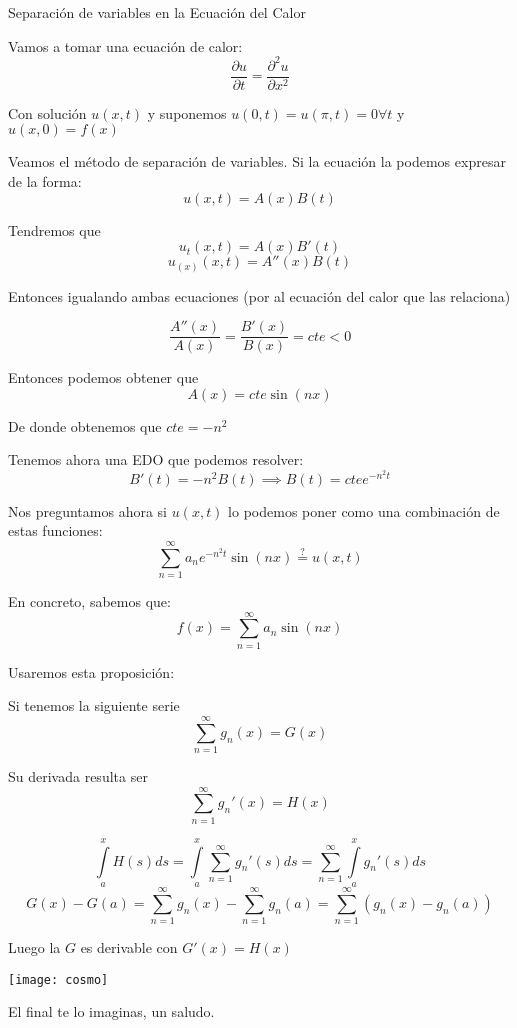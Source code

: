\documentclass[openany]{book}
\begin{document}
\begin{method}
  Separación de variables en la Ecuación del Calor
  
  Vamos a tomar una ecuación de calor:
  $$ \dfrac{\partial u}{\partial t} = \dfrac{\partial ^2 u}{\partial x^2} $$
  
  Con solución $ u(x,t) $ y suponemos $ u(0,t) = u(\pi,t) = 0 \forall t $ y $ u(x,0) = f(x) $
  
  Veamos el método de separación de variables. Si la ecuación la podemos expresar de la forma:
  $$ u(x,t) = A(x)B(t)$$
  
  Tendremos que
  $$ u_{t}(x,t) = A(x)B'(t) $$
  $$ u_{(x)}(x,t) = A''(x)B(t) $$
  
  Entonces igualando ambas ecuaciones (por al ecuación del calor que las relaciona)
  
  $$ \dfrac{A''(x)}{A(x)} = \dfrac{B'(x)}{B(x)} = cte <0$$
  
  Entonces podemos obtener que
  $$ A(x) = cte \sin(nx) $$

  De donde obtenemos que $ cte = -n^2 $

  Tenemos ahora una EDO que podemos resolver:
  $$ B'(t) = -n^2B(t) \implies B(t) = cte e^{-n^2t} $$

  Nos preguntamos ahora si $ u(x,t) $ lo podemos poner como una combinación de estas funciones:
  $$ \sum\limits_{n=1}^{\infty}a_ne^{-n^2t}\sin(nx) \stackrel{?}{=} u(x,t) $$
  
  En concreto, sabemos que:
  $$ f(x) = \sum\limits_{n=1}^{\infty}a_n \sin(nx) $$
  
  Usaremos esta proposición:
  
  \begin{proposition}
    Si tenemos la siguiente serie
    $$ \sum\limits_{n=1}^{\infty}g_n(x) = G(x) $$
    
    Su derivada resulta ser
    $$ \sum\limits_{n=1}^{\infty}g_n'(x) = H(x) $$
    
  \end{proposition}
  
  \begin{demonstration}
    $$ \int\limits_{a}^{x}H(s)ds = \int\limits_{a}^{x} \sum\limits_{n=1}^{\infty} g_n'(s)ds = \sum\limits_{n=1}^{\infty} \int\limits_{a}^{x} g_n'(s)ds $$
    $$ G(x)-G(a) = \sum\limits_{n=1}^{\infty}g_n(x) - \sum\limits_{n=1}^{\infty}g_n(a) = \sum\limits_{n=1}^{\infty}(g_n(x)-g_n(a)) $$
    
    Luego la $ G $ es derivable con $ G'(x) = H(x) $
  \end{demonstration}
  
  \begin{minipage}[l]{0.1\textwidth}
    \texttt{[image: cosmo]}
    \end{minipage}
    \begin{minipage}[l]{0.8\textwidth}
    El final te lo imaginas, un saludo.
  \end{minipage}
    
  
\end{method}
\end{document}
